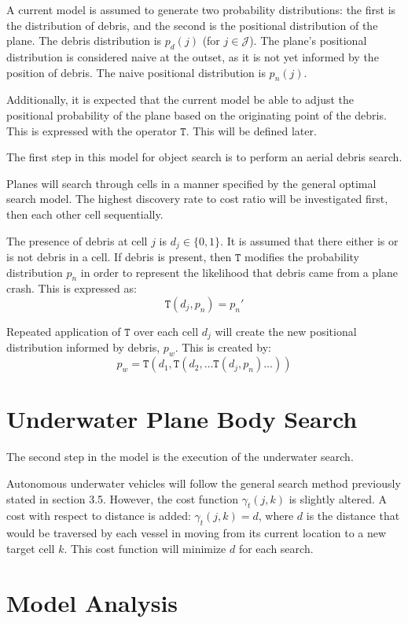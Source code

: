 \documentclass[a4paper]{article}
\begin{document}
A current model is assumed to generate two probability distributions: the first is the distribution of debris, and the second is the positional distribution of the plane. The debris distribution is $p_d(j)$ (for $j\in\mathcal{J}$). The plane's positional distribution is considered naive at the outset, as it is not yet informed by the position of debris. The naive positional distribution is $p_n(j)$. 

Additionally, it is expected that the current model be able to adjust the positional probability of the plane based on the originating point of the debris. This is expressed with the operator $\mathtt{T}$. This will be defined later. 

The first step in this model for object search is to perform an aerial debris search. 

Planes will search through cells in a manner specified by the general optimal search model. The highest discovery rate to cost ratio will be investigated first, then each other cell sequentially.

The presence of debris at cell $j$ is $d_j\in \{0,1\}$. It is assumed that there either is or is not debris in a cell. If debris is present, then $\mathtt{T}$ modifies the probability distribution $p_n$ in order to represent the likelihood that debris came from a plane crash. This is expressed as: $$\mathtt{T}(d_j,p_n)=p_n'$$

Repeated application of $\mathtt{T}$ over each cell $d_j$ will create the new positional distribution informed by debris, $p_w$. This is created by: $$p_w=\mathtt{T}(d_1, \mathtt{T}(d_2, \ldots \mathtt{T}(d_j, p_n)\ldots))$$

\section{Underwater Plane Body Search}

The second step in the model is the execution of the underwater search. 

Autonomous underwater vehicles will follow the general search method previously stated in section 3.5. However, the cost function $\gamma_t(j,k)$ is slightly altered. A cost with respect to distance is added: $\gamma_t(j,k)=d$, where $d$ is the distance that would be traversed by each vessel in moving from its current location to a new target cell $k$. This cost function will minimize $d$ for each search. 

\section{Model Analysis}
\end{document}
